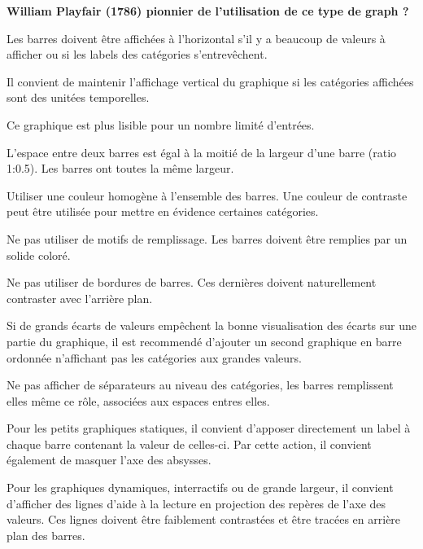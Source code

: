 \documentclass[a4paper,12pt]{article}
\begin{document}
\begin{multicols}{2}
\textbf{William Playfair (1786) pionnier de l'utilisation de ce type de graph ?}

Les barres doivent être affichées à l'horizontal s'il y a beaucoup de valeurs à afficher ou si les labels des catégories s'entrevêchent. \autocite{alansmithLexiqueVisuel,sosulskiGraphics2019,wilkeVisualizingAmounts2019,stephenfewComponentlevelGraphDesign2012,jonathanschwabishComparingCategories2021}

Il convient de maintenir l'affichage vertical du graphique si les catégories affichées sont des unitées temporelles. \autocite{stephenfewComponentlevelGraphDesign2012}

Ce graphique est plus lisible pour un nombre limité d'entrées. \autocite{mikeyiHowChooseRight2020}

L'espace entre deux barres est égal à la moitié de la largeur d'une barre (ratio 1:0.5). Les barres ont toutes la même largeur. \autocite{stephenfewComponentlevelGraphDesign2012}

Utiliser une couleur homogène à l'ensemble des barres. Une couleur de contraste peut être utilisée pour mettre en évidence certaines catégories.

Ne pas utiliser de motifs de remplissage. Les barres doivent être remplies par un solide coloré. \autocite{stephenfewComponentlevelGraphDesign2012}

Ne pas utiliser de bordures de barres. Ces dernières doivent naturellement contraster avec l'arrière plan.

Si de grands écarts de valeurs empêchent la bonne visualisation des écarts sur une partie du graphique, il est recommendé d'ajouter un second graphique en barre ordonnée n'affichant pas les catégories aux grandes valeurs. \autocite{jonathanschwabishComparingCategories2021}

Ne pas afficher de séparateurs au niveau des catégories, les barres remplissent elles même ce rôle, associées aux espaces entres elles. \autocite{jonathanschwabishComparingCategories2021}

Pour les petits graphiques statiques, il convient d'apposer directement un label à chaque barre contenant la valeur de celles-ci. Par cette action, il convient également de masquer l'axe des absysses. \autocite{jonathanschwabishComparingCategories2021}

Pour les graphiques dynamiques, interractifs ou de grande largeur, il convient d'afficher des lignes d'aide à la lecture en projection des repères de l'axe des valeurs. Ces lignes doivent être faiblement contrastées et être tracées en arrière plan des barres. \autocite{jonathanschwabishComparingCategories2021}


\end{multicols}
\end{document}
